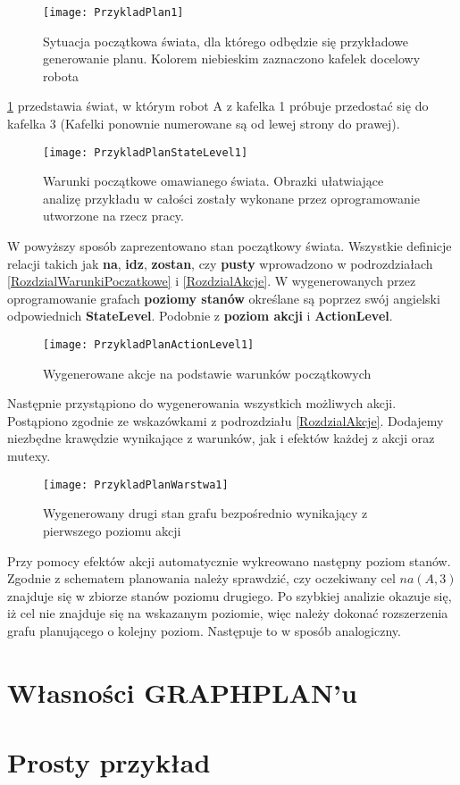     \begin{figure}[H]
        \texttt{[image: PrzykladPlan1]}
        \centering
        \caption{Sytuacja początkowa świata, dla którego odbędzie się przykładowe generowanie planu. Kolorem niebieskim zaznaczono kafelek docelowy robota}
        \label{PrzykladPlan1}
    \end{figure}

    \ref{PrzykladPlan1} przedstawia świat, w którym robot A z kafelka 1 próbuje przedostać się do kafelka 3 (Kafelki ponownie numerowane są od lewej strony
    do prawej).

    \begin{figure}[H]
        \texttt{[image: PrzykladPlanStateLevel1]}
        \centering
        \caption{Warunki początkowe omawianego świata. Obrazki ułatwiające analizę przykładu w całości zostały 
        wykonane przez oprogramowanie utworzone na rzecz pracy. }
        \label{PrzykladPlanWP}
    \end{figure}
    W powyższy sposób zaprezentowano stan początkowy świata. Wszystkie definicje relacji takich jak \textbf{na}, \textbf{idz}, \textbf{zostan}, czy 
    \textbf{pusty} wprowadzono w podrozdziałach \ref{RozdzialWarunkiPoczatkowe} i \ref{RozdzialAkcje}. W wygenerowanych przez oprogramowanie grafach \textbf{poziomy stanów}
    określane są poprzez swój angielski odpowiednich \textbf{StateLevel}. Podobnie z \textbf{poziom akcji} i \textbf{ActionLevel}. 

    \begin{figure}[H]
        \texttt{[image: PrzykladPlanActionLevel1]}
        \centering
        \caption{Wygenerowane akcje na podstawie warunków początkowych}
        \label{PrzykladPlanAP1}
    \end{figure}

    Następnie przystąpiono do wygenerowania wszystkich możliwych akcji. Postąpiono zgodnie ze wskazówkami z podrozdziału \ref{RozdzialAkcje}. 
    Dodajemy niezbędne krawędzie wynikające z warunków, jak i efektów każdej z akcji oraz mutexy.

    \begin{figure}[H]
        \texttt{[image: PrzykladPlanWarstwa1]}
        \centering
        \caption{Wygenerowany drugi stan grafu bezpośrednio wynikający z pierwszego poziomu akcji}
        \label{PrzykladPlanW1}
    \end{figure}

    Przy pomocy efektów akcji automatycznie wykreowano następny poziom stanów. Zgodnie z schematem planowania należy sprawdzić, czy oczekiwany cel
    $na(A,3)$ znajduje się w zbiorze stanów poziomu drugiego. Po szybkiej analizie okazuje się, iż cel nie znajduje się na wskazanym poziomie, więc
    należy dokonać rozszerzenia grafu planującego o kolejny poziom. Następuje to w sposób analogiczny.



\section{Własności GRAPHPLAN'u}

\section{Prosty przykład}
